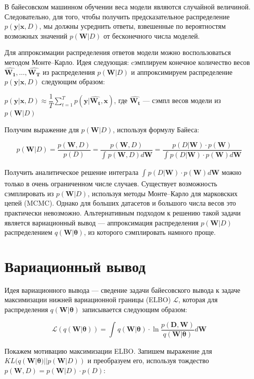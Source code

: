 \documentclass{article}
\begin{document}
В байесовском машинном обучении веса модели являются случайной величиной. Следовательно, для того,
чтобы получить предсказательное распределение $p(\mathbf{y} | \mathbf{x}, D)$, мы должны усреднить ответы,
взвешенные по вероятностям возможных значений $p(\mathbf{W} | D)$ от бесконечного числа моделей.

Для аппроксимации распределения ответов модели можно воспользоваться методом Монте--Карло. Идея следующая: cэмплируем конечное количество весов $\hat{\mathbf{W_1}}, \dots, \hat{\mathbf{W_T}}$ из распределения $p(\mathbf{W}| D)$  и аппроксимируем распределение $p(\mathbf{y} | \mathbf{x}, D)$ следующим образом:

$
p(\mathbf{y} | \mathbf{x}, D)
\approx \dfrac{1}{T} \sum_{t=1}^{T}{p(\mathbf{y} | \hat{\mathbf{W_t}}, \mathbf{x})}
$, где $\hat{\mathbf{W_t}}$ --- сэмпл весов модели из $p(\mathbf{W}| D)$

Получим выражение для $p(\mathbf{W}| D)$, используя формулу Байеса:

\[
p(\mathbf{W}| D) =
\dfrac{p(\mathbf{W}, D)}{p(D)} =
\dfrac{p(\mathbf{W}, D)}{\int_{}{} p(\mathbf{W}, D) d\mathbf{W}} =
\dfrac{p(D | \mathbf{W}) \cdot p(\mathbf{W})}{\int_{}{} p(D | \mathbf{W}) \cdot p(\mathbf{W}) d\mathbf{W}}
\]

Получить аналитическое решение интеграла $\int_{}{} p(D | \mathbf{W}) \cdot p(\mathbf{W}) d\mathbf{W}$ можно только в очень ограниченном числе случаев. Существует возможность сэмплировать из $p(\mathbf{W}| D)$, используя методы Монте--Карло для марковских цепей (MCMC). Однако для больших датасетов и большого числа весов это практически невозможно. Альтернативным подходом к решению такой задачи является вариационный вывод --- аппроксимация распределения $p(\mathbf{W}| D)$ распределением $q(\mathbf{W} | \pmb{\theta})$, из которого сэмплировать намного проще.


\section{Вариационный вывод}
Идея вариационного вывода --- сведение задачи байесовского вывода к задаче максимизации нижней вариационной границы (ELBO) $\mathcal{L}$, которая для распределения $q(\mathbf{W} | \pmb{\theta})$ записывается следующим образом:

\[
\mathcal{L}(q(\mathbf{W} | \pmb{\theta})) =
\int_{}{} q(\mathbf{W} | \pmb{\theta}) \cdot \ln{\dfrac{p(\mathbf{D}, \mathbf{W})}{q(\mathbf{W} | \pmb{\theta})}} d\mathbf{W}
\]

Покажем мотивацию максимизации ELBO.
Запишем выражение для $KL(q(\mathbf{W} | \pmb{\theta}) || p(\mathbf{W}| D))$ и преобразуем его,
используя тождество $p(\mathbf{W}, D) = p(\mathbf{W}| D)\cdot p(D)$:
\end{document}
